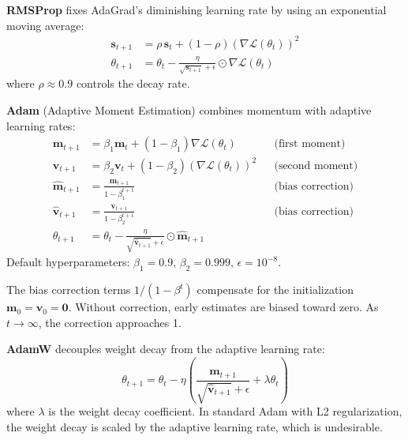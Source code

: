 \begin{definition}[RMSProp]
    \textbf{RMSProp} fixes AdaGrad's diminishing learning rate by using an exponential moving average:
    \begin{align}
        \mathbf{s}_{t+1} &= \rho\, \mathbf{s}_t + (1-\rho)(\nabla \mathcal{L}(\theta_t))^2 \\
        \theta_{t+1} &= \theta_t - \frac{\eta}{\sqrt{\mathbf{s}_{t+1}} + \epsilon} \odot \nabla \mathcal{L}(\theta_t)
    \end{align}
    where $\rho \approx 0.9$ controls the decay rate.
\end{definition}

\begin{definition}[Adam]
    \textbf{Adam} (Adaptive Moment Estimation) combines momentum with adaptive learning rates:
    \begin{align}
        \mathbf{m}_{t+1} &= \beta_1 \mathbf{m}_t + (1-\beta_1) \nabla \mathcal{L}(\theta_t) & &\text{(first moment)} \\
        \mathbf{v}_{t+1} &= \beta_2 \mathbf{v}_t + (1-\beta_2) (\nabla \mathcal{L}(\theta_t))^2 & &\text{(second moment)} \\
        \hat{\mathbf{m}}_{t+1} &= \frac{\mathbf{m}_{t+1}}{1 - \beta_1^{t+1}} & &\text{(bias correction)} \\
        \hat{\mathbf{v}}_{t+1} &= \frac{\mathbf{v}_{t+1}}{1 - \beta_2^{t+1}} & &\text{(bias correction)} \\
        \theta_{t+1} &= \theta_t - \frac{\eta}{\sqrt{\hat{\mathbf{v}}_{t+1}} + \epsilon} \odot \hat{\mathbf{m}}_{t+1}
    \end{align}
    Default hyperparameters: $\beta_1 = 0.9$, $\beta_2 = 0.999$, $\epsilon = 10^{-8}$.
\end{definition}

\begin{remark}
    The bias correction terms $1/(1-\beta^t)$ compensate for the initialization $\mathbf{m}_0 = \mathbf{v}_0 = \mathbf{0}$. Without correction, early estimates are biased toward zero. As $t \to \infty$, the correction approaches 1.
\end{remark}

\begin{definition}[AdamW]
    \textbf{AdamW} decouples weight decay from the adaptive learning rate:
    \[
        \theta_{t+1} = \theta_t - \eta\left(\frac{\hat{\mathbf{m}}_{t+1}}{\sqrt{\hat{\mathbf{v}}_{t+1}} + \epsilon} + \lambda \theta_t\right)
    \]
    where $\lambda$ is the weight decay coefficient. In standard Adam with L2 regularization, the weight decay is scaled by the adaptive learning rate, which is undesirable.
\end{definition}

